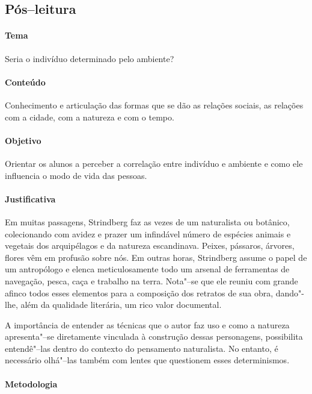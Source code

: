 \documentclass[12pt]{extarticle}
\begin{document}
\subsection{Pós--leitura}

\paragraph{Tema} Seria o indivíduo determinado pelo ambiente? 

\paragraph{Conteúdo} Conhecimento e articulação das formas que se dão as 
relações sociais, as relações com a cidade, com a natureza e com o tempo.

\paragraph{Objetivo} Orientar os alunos a perceber a 
correlação entre indivíduo e ambiente e como ele influencia o modo de vida 
das pessoas.

\paragraph{Justificativa} Em muitas passagens, Strindberg
faz as vezes de um naturalista ou botânico, colecionando
com avidez e prazer um infindável número de espécies
animais e vegetais dos arquipélagos e da natureza escandinava.
Peixes, pássaros, árvores, flores vêm em profusão
sobre nós. Em outras horas, Strindberg assume o papel
de um antropólogo e elenca meticulosamente todo um arsenal
de ferramentas de navegação, pesca, caça e trabalho na
terra. Nota"--se que ele reuniu com grande afinco todos esses
elementos para a composição dos retratos de sua obra, dando"-lhe,
além da qualidade literária, um rico valor documental.

A importância de entender as técnicas que o autor faz uso e como a natureza 
apresenta"--se diretamente vinculada à construção dessas personagens, 
possibilita entendê"--las dentro do contexto do pensamento naturalista. 
No entanto, é necessário olhá"--las também com lentes que questionem esses determinismos.

\paragraph{Metodologia}
\end{document}
